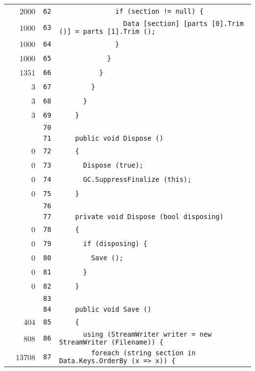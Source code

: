 \documentclass[a4paper,10pt]{article}
\begin{document}
\begin{longtable}[l]{lrrl}
\cellcolor{green} & 2000 & \verb~62~ & \verb~              if (section != null) {~\\
\cellcolor{green} & 1000 & \verb~63~ & \verb~                Data [section] [parts [0].Trim ()] = parts [1].Trim ();~\\
\cellcolor{green} & 1000 & \verb~64~ & \verb~              }~\\
\cellcolor{green} & 1000 & \verb~65~ & \verb~            }~\\
\cellcolor{green} & 1351 & \verb~66~ & \verb~          }~\\
\cellcolor{green} & 3 & \verb~67~ & \verb~        }~\\
\cellcolor{green} & 3 & \verb~68~ & \verb~      }~\\
\cellcolor{green} & 3 & \verb~69~ & \verb~    }~\\
\cellcolor{gray} &  & \verb~70~ & \verb~~\\
\cellcolor{gray} &  & \verb~71~ & \verb~    public void Dispose ()~\\
\cellcolor{red} & 0 & \verb~72~ & \verb~    {~\\
\cellcolor{red} & 0 & \verb~73~ & \verb~      Dispose (true);~\\
\cellcolor{red} & 0 & \verb~74~ & \verb~      GC.SuppressFinalize (this);~\\
\cellcolor{red} & 0 & \verb~75~ & \verb~    }~\\
\cellcolor{gray} &  & \verb~76~ & \verb~~\\
\cellcolor{gray} &  & \verb~77~ & \verb~    private void Dispose (bool disposing)~\\
\cellcolor{red} & 0 & \verb~78~ & \verb~    {~\\
\cellcolor{red} & 0 & \verb~79~ & \verb~      if (disposing) {~\\
\cellcolor{red} & 0 & \verb~80~ & \verb~        Save ();~\\
\cellcolor{red} & 0 & \verb~81~ & \verb~      }~\\
\cellcolor{red} & 0 & \verb~82~ & \verb~    }~\\
\cellcolor{gray} &  & \verb~83~ & \verb~~\\
\cellcolor{gray} &  & \verb~84~ & \verb~    public void Save ()~\\
\cellcolor{green} & 404 & \verb~85~ & \verb~    {~\\
\cellcolor{green} & 808 & \verb~86~ & \verb~      using (StreamWriter writer = new StreamWriter (Filename)) {~\\
\cellcolor{green} & 13708 & \verb~87~ & \verb~        foreach (string section in Data.Keys.OrderBy (x => x)) {~\\

\end{longtable}
\end{document}
